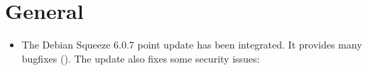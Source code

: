\newcommand{\ucsUCRV}[1]{Univention Configuration Registry variable \ucsCommand{\ucsBCindex{#1}}}
\newcommand{\ucsCVE}[1]{\href{http://security-tracker.debian.org/tracker/CVE-#1}{CVE-#1}}

\section{General}

\begin{itemize}

\item The Debian Squeeze 6.0.7 point update has been integrated. It
  provides many bugfixes (). The update also fixes
  some security issues:


\end{itemize}
